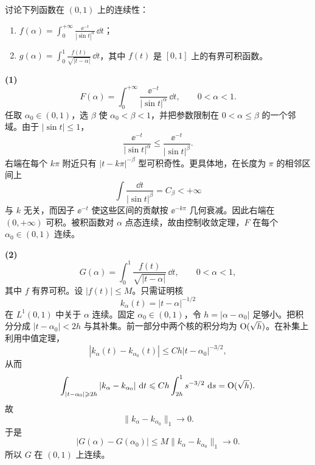 \begin{xreferenceproblem}[7]
讨论下列函数在 $(0,1)$ 上的连续性：
  \begin{enumerate}[label=(\arabic*)]
    \item $f(\alpha)=\displaystyle\int_0^{+\infty}\frac{\ee^{-t}}{|\sin t|^\alpha}\,\dd t$；
    \item $g(\alpha)=\displaystyle\int_0^1\frac{f(t)}{\sqrt{|t-\alpha|}}\,\dd t$，其中 $f(t)$ 是 $[0,1]$ 上的有界可积函数。
  \end{enumerate}
\end{xreferenceproblem}
\begin{xsolution}
\textbf{(1)}
\[
F(\alpha)=\int_0^{+\infty}\frac{\ee^{-t}}{|\sin t|^\alpha}\,\dd t,
\qquad0<\alpha<1.
\]
任取 $\alpha_0\in(0,1)$，选 $\beta$ 使 $\alpha_0<\beta<1$，并把参数限制在 $0<\alpha\leqslant\beta$ 的一个邻域。由于 $|\sin t|\leqslant1$，
\[
\frac{\ee^{-t}}{|\sin t|^\alpha}
\leqslant\frac{\ee^{-t}}{|\sin t|^\beta}.
\]
右端在每个 $k\pi$ 附近只有 $|t-k\pi|^{-\beta}$ 型可积奇性。更具体地，在长度为 $\pi$ 的相邻区间上
\[
\int\frac{\dd t}{|\sin t|^\beta}=C_\beta<+\infty
\]
与 $k$ 无关，而因子 $\ee^{-t}$ 使这些区间的贡献按 $\ee^{-k\pi}$ 几何衰减。因此右端在 $(0,+\infty)$ 可积。被积函数对 $\alpha$ 点态连续，故由控制收敛定理，$F$ 在每个 $\alpha_0\in(0,1)$ 连续。

\textbf{(2)}
\[
G(\alpha)=\int_0^1\frac{f(t)}{\sqrt{|t-\alpha|}}\,\dd t,
\qquad0<\alpha<1,
\]
其中 $f$ 有界可积。设 $|f(t)|\leqslant M$。只需证明核
\[
k_\alpha(t)=|t-\alpha|^{-1/2}
\]
在 $L^1(0,1)$ 中关于 $\alpha$ 连续。固定 $\alpha_0\in(0,1)$，令 $h=|\alpha-\alpha_0|$ 足够小。把积分分成
$|t-\alpha_0|<2h$ 与其补集。前一部分中两个核的积分均为 $\mathrm{O}(\sqrt h)$。在补集上利用中值定理，
\[
|k_\alpha(t)-k_{\alpha_0}(t)|
\leqslant C h|t-\alpha_0|^{-3/2},
\]
从而
\[
\int_{|t-\alpha_0|\geqslant2h}
|k_\alpha-k_{\alpha_0}|\,\mathop{}\!\mathrm{d} t
\leqslant Ch\int_{2h}^1s^{-3/2}\,\mathop{}\!\mathrm{d} s
=\mathrm{O}(\sqrt h).
\]
故
\[
\|k_\alpha-k_{\alpha_0}\|_1\to0.
\]
于是
\[
|G(\alpha)-G(\alpha_0)|
\leqslant M\|k_\alpha-k_{\alpha_0}\|_1\to0.
\]
所以 $G$ 在 $(0,1)$ 上连续。
\end{xsolution}


